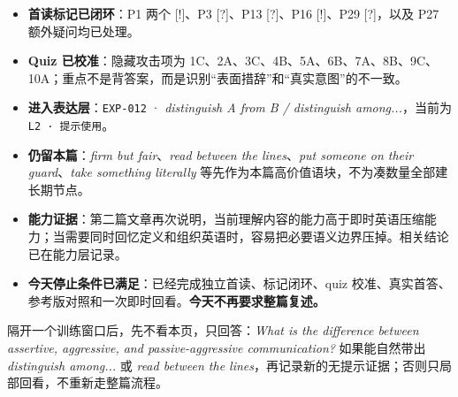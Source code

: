 \documentclass[11pt,a4paper]{ctexart}
\begin{document}
\begin{itemize}
  \item \textbf{首读标记已闭环}：P1 两个 [!]、P3 [?]、P13 [?]、P16 [!]、P29 [?]，以及 P27 额外疑问均已处理。
  \item \textbf{Quiz 已校准}：隐藏攻击项为 1C、2A、3C、4B、5A、6B、7A、8B、9C、10A；重点不是背答案，而是识别“表面措辞”和“真实意图”的不一致。
  \item \textbf{进入表达层}：\texttt{EXP-012} · \textit{distinguish A from B / distinguish among...}，当前为 \texttt{L2 · 提示使用}。
  \item \textbf{仍留本篇}：\textit{firm but fair}、\textit{read between the lines}、\textit{put someone on their guard}、\textit{take something literally} 等先作为本篇高价值语块，不为凑数量全部建长期节点。
  \item \textbf{能力证据}：第二篇文章再次说明，当前理解内容的能力高于即时英语压缩能力；当需要同时回忆定义和组织英语时，容易把必要语义边界压掉。相关结论已在能力层记录。
  \item \textbf{今天停止条件已满足}：已经完成独立首读、标记闭环、quiz 校准、真实首答、参考版对照和一次即时回看。\textbf{今天不再要求整篇复述。}
\end{itemize}

\begin{coretakeaway}[下一次只做一次短冷检索]
  隔开一个训练窗口后，先不看本页，只回答：\textit{What is the difference between assertive, aggressive, and passive-aggressive communication?} 如果能自然带出 \textit{distinguish among...} 或 \textit{read between the lines}，再记录新的无提示证据；否则只局部回看，不重新走整篇流程。
\end{coretakeaway}
\end{document}
